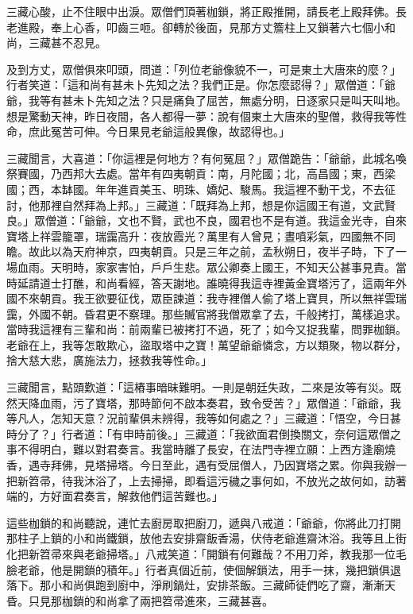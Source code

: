 三藏心酸，止不住眼中出淚。眾僧們頂著枷鎖，將正殿推開，請長老上殿拜佛。長老進殿，奉上心香，叩齒三咂。卻轉於後面，見那方丈簷柱上又鎖著六七個小和尚，三藏甚不忍見。

及到方丈，眾僧俱來叩頭，問道：「列位老爺像貌不一，可是東土大唐來的麼？」行者笑道：「這和尚有甚未卜先知之法？我們正是。你怎麼認得？」眾僧道：「爺爺，我等有甚未卜先知之法？只是痛負了屈苦，無處分明，日逐家只是叫天叫地。想是驚動天神，昨日夜間，各人都得一夢：說有個東土大唐來的聖僧，救得我等性命，庶此冤苦可伸。今日果見老爺這般異像，故認得也。」

三藏聞言，大喜道：「你這裡是何地方？有何冤屈？」眾僧跪告：「爺爺，此城名喚祭賽國，乃西邦大去處。當年有四夷朝貢：南，月陀國；北，高昌國；東，西梁國；西，本缽國。年年進貢美玉、明珠、嬌妃、駿馬。我這裡不動干戈，不去征討，他那裡自然拜為上邦。」三藏道：「既拜為上邦，想是你這國王有道，文武賢良。」眾僧道：「爺爺，文也不賢，武也不良，國君也不是有道。我這金光寺，自來寶塔上祥雲籠罩，瑞靄高升：夜放霞光？萬里有人曾見；晝噴彩氣，四國無不同瞻。故此以為天府神京，四夷朝貢。只是三年之前，孟秋朔日，夜半子時，下了一場血雨。天明時，家家害怕，戶戶生悲。眾公卿奏上國王，不知天公甚事見責。當時延請道士打醮，和尚看經，答天謝地。誰曉得我這寺裡黃金寶塔污了，這兩年外國不來朝貢。我王欲要征伐，眾臣諫道：我寺裡僧人偷了塔上寶貝，所以無祥雲瑞靄，外國不朝。昏君更不察理。那些贓官將我僧眾拿了去，千般拷打，萬樣追求。當時我這裡有三輩和尚：前兩輩已被拷打不過，死了；如今又捉我輩，問罪枷鎖。老爺在上，我等怎敢欺心，盜取塔中之寶！萬望爺爺憐念，方以類聚，物以群分，捨大慈大悲，廣施法力，拯救我等性命。」

三藏聞言，點頭歎道：「這樁事暗昧難明。一則是朝廷失政，二來是汝等有災。既然天降血雨，污了寶塔，那時節何不啟本奏君，致令受苦？」眾僧道：「爺爺，我等凡人，怎知天意？況前輩俱未辨得，我等如何處之？」三藏道：「悟空，今日甚時分了？」行者道：「有申時前後。」三藏道：「我欲面君倒換關文，奈何這眾僧之事不得明白，難以對君奏言。我當時離了長安，在法門寺裡立願：上西方逢廟燒香，遇寺拜佛，見塔掃塔。今日至此，遇有受屈僧人，乃因寶塔之累。你與我辦一把新笤帚，待我沐浴了，上去掃掃，即看這污穢之事何如，不放光之故何如，訪著端的，方好面君奏言，解救他們這苦難也。」

這些枷鎖的和尚聽說，連忙去廚房取把廚刀，遞與八戒道：「爺爺，你將此刀打開那柱子上鎖的小和尚鐵鎖，放他去安排齋飯香湯，伏侍老爺進齋沐浴。我等且上街化把新笤帚來與老爺掃塔。」八戒笑道：「開鎖有何難哉？不用刀斧，教我那一位毛臉老爺，他是開鎖的積年。」行者真個近前，使個解鎖法，用手一抹，幾把鎖俱退落下。那小和尚俱跑到廚中，淨刷鍋灶，安排茶飯。三藏師徒們吃了齋，漸漸天昏。只見那枷鎖的和尚拿了兩把笤帚進來，三藏甚喜。

